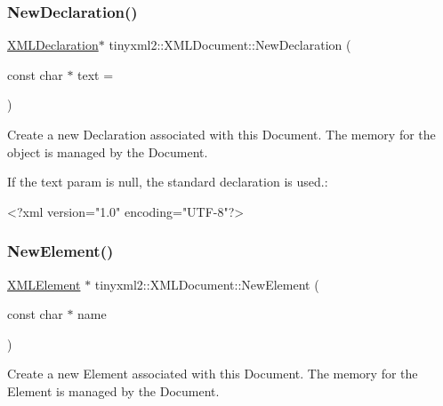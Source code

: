 \subsubsection{\texorpdfstring{New\+Declaration()}{NewDeclaration()}\hspace{0.1cm}{\footnotesize\ttfamily [2/2]}}
{\footnotesize\ttfamily \hyperlink{classtinyxml2_1_1XMLDeclaration}{X\+M\+L\+Declaration}$\ast$ tinyxml2\+::\+X\+M\+L\+Document\+::\+New\+Declaration (\begin{DoxyParamCaption}\item[{const char $\ast$}]{text = {} }\end{DoxyParamCaption})}

Create a new Declaration associated with this Document. The memory for the object is managed by the Document.

If the \textquotesingle{}text\textquotesingle{} param is null, the standard declaration is used.\+: \begin{DoxyVerb}    <?xml version="1.0" encoding="UTF-8"?>
\end{DoxyVerb}
 \mbox{\label{classtinyxml2_1_1XMLDocument_a3c335a700a43d7c363a393142a23f234}} 
\subsubsection{\texorpdfstring{New\+Element()}{NewElement()}\hspace{0.1cm}{\footnotesize\ttfamily [1/2]}}
{\footnotesize\ttfamily \hyperlink{classtinyxml2_1_1XMLElement}{X\+M\+L\+Element} $\ast$ tinyxml2\+::\+X\+M\+L\+Document\+::\+New\+Element (\begin{DoxyParamCaption}\item[{const char $\ast$}]{name }\end{DoxyParamCaption})}

Create a new Element associated with this Document. The memory for the Element is managed by the Document. \mbox{\label{classtinyxml2_1_1XMLDocument_a8aa7817d4a1001364b06373763ab99d6}} 
